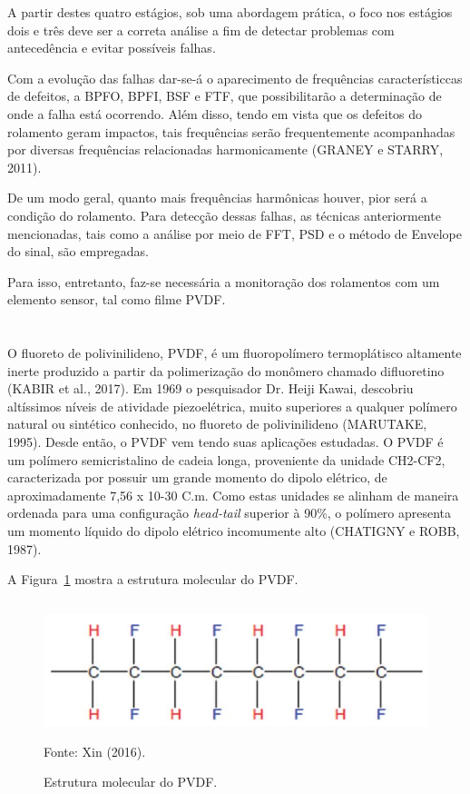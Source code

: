 \documentclass[
	12pt,				
	oneside,			
	a4paper,			
	english,			
	brazil,	
	sumario=abnt-6027-2012		
	]{abntex2ppgsi}
\begin{document}
A partir destes quatro estágios, sob uma abordagem prática, o foco nos estágios dois e três deve ser a correta análise a fim de detectar problemas com antecedência e evitar possíveis falhas. 

Com a evolução das falhas dar-se-á o aparecimento de frequências característiccas de defeitos, a BPFO, BPFI, BSF e FTF, que possibilitarão a determinação de onde a falha está ocorrendo. Além disso, tendo em vista que os defeitos do rolamento geram impactos, tais frequências serão frequentemente acompanhadas por diversas frequências relacionadas harmonicamente (GRANEY e STARRY, 2011). 

De um modo geral, quanto mais frequências harmônicas houver, pior será a condição do rolamento. Para detecção dessas falhas, as técnicas anteriormente mencionadas, tais como a análise por meio de FFT, PSD e o método de Envelope do sinal, são empregadas. 

Para isso, entretanto, faz-se necessária a monitoração dos rolamentos com um elemento sensor, tal como filme PVDF.

\newpage
\section{}
\label{secao:PVDF}

O fluoreto de polivinilideno, PVDF, é um fluoropolímero termoplátisco altamente inerte produzido a partir da polimerização do monômero chamado difluoretino (KABIR et al., 2017). Em 1969 o pesquisador Dr. Heiji Kawai, descobriu altíssimos níveis de atividade piezoelétrica, muito superiores a qualquer polímero natural ou sintético conhecido, no fluoreto de polivinilideno (MARUTAKE, 1995). Desde então, o PVDF vem tendo suas aplicações estudadas. O PVDF é um polímero semicristalino de cadeia longa, proveniente da unidade CH2-CF2, caracterizada por possuir um grande momento do dipolo elétrico, de aproximadamente 7,56 x 10-30 C.m. Como estas unidades se alinham de maneira ordenada para uma configuração \textit{head-tail} superior à 90\%, o polímero apresenta um momento líquido do dipolo elétrico incomumente alto (CHATIGNY e ROBB, 1987).

A Figura~\ref{pvdf_cadeia} mostra a estrutura molecular do PVDF.

\begin{figure}[H]
\centering
\caption {Estrutura molecular do PVDF.}
\includegraphics[width=\textwidth,height=40mm,keepaspectratio]{pvdf_cadeia} \\
Fonte: Xin (2016).
\label{pvdf_cadeia}
\end{figure}
\end{document}
